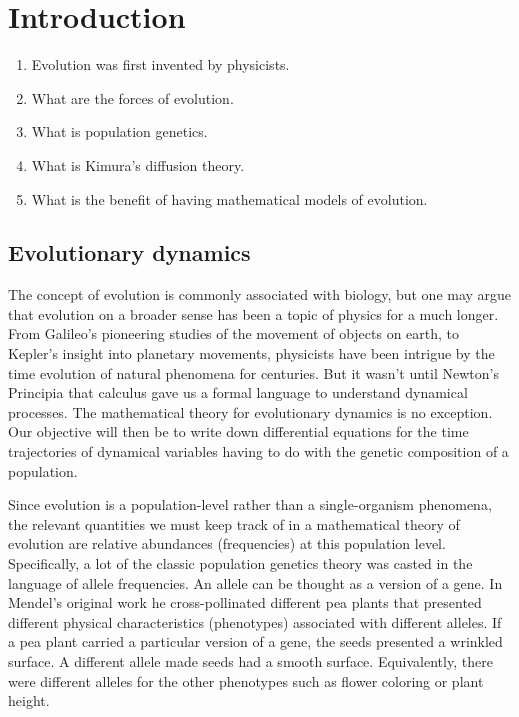 \section{Introduction}

\begin{enumerate}
    \item Evolution was first invented by physicists.
    \item What are the forces of evolution.
    \item What is population genetics.
    \item What is Kimura's diffusion theory.
    \item What is the benefit of having mathematical models of evolution.
\end{enumerate}

\subsection{Evolutionary dynamics}

\noindent
The concept of evolution is commonly associated with biology, but one may argue
that evolution on a broader sense has been a topic of physics for a much longer.
From Galileo's pioneering studies of the movement of objects on earth, to
Kepler's insight into planetary movements, physicists have been intrigue by the
time evolution of natural phenomena for centuries. But it wasn't until Newton's
Principia that calculus gave us a formal language to understand dynamical
processes. The mathematical theory for evolutionary dynamics is no exception.
Our objective will then be to write down differential equations for the time
trajectories of dynamical variables having to do with the genetic composition of
a population.

Since evolution is a population-level rather than a single-organism phenomena,
the relevant quantities we must keep track of in a mathematical theory of
evolution are relative abundances (frequencies) at this population level.
Specifically, a lot of the classic population genetics theory was casted in the
language of allele frequencies. An allele can be thought as a version of a gene.
In Mendel's original work he cross-pollinated different pea plants that
presented different physical characteristics (phenotypes) associated with
different alleles. If a pea plant carried a particular version of a gene, the
seeds presented a wrinkled surface. A different allele made seeds had a smooth
surface. Equivalently, there were different alleles for the other phenotypes
such as flower coloring or plant height.

